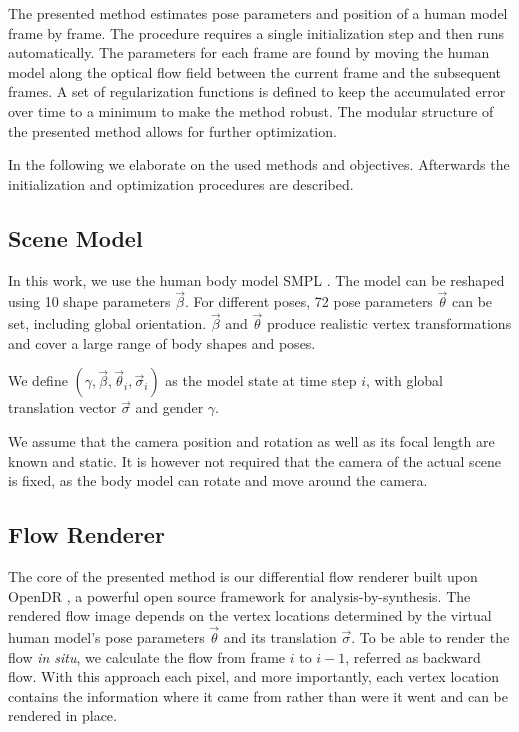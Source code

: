 \documentclass[10pt,twocolumn,letterpaper]{article}
\begin{document}
 The presented method estimates pose parameters and position of a human model frame by frame. The procedure requires a single initialization step and then runs automatically. The parameters for each frame are found by moving the human model along the optical flow field between the current frame and the subsequent frames. A set of regularization functions is defined to keep the accumulated error over time to a minimum to make the method robust. The modular structure of the presented method allows for further optimization.
 
 In the following we elaborate on the used methods and objectives. Afterwards the initialization and optimization procedures are described.
 
 \subsection{Scene Model}
 In this work, we use the human body model SMPL \cite{smpl2015loper}. %
 The model can be reshaped using 10 shape parameters $\vec{\beta}$. For different poses, 72 pose parameters $\vec{\theta}$ can be set, including global orientation. $\vec{\beta}$ and $\vec{\theta}$ produce realistic vertex transformations and cover a large range of body shapes and poses. 
 
 We define $(\gamma, \vec{\beta}, \vec{\theta}_i, \vec{\sigma}_i)$ as the model state at time step $i$, with global translation vector $\vec{\sigma}$ and gender $\gamma$. %
 
 We assume that the camera position and rotation as well as its focal length are known and static. It is however not required that the camera of the actual scene is fixed, as the body model can rotate and move around the camera.
 
 
 \subsection{Flow Renderer}
 
 The core of the presented method is our differential flow renderer built upon OpenDR \cite{loper2014opendr}, a powerful open source framework for analysis-by-synthesis. The rendered flow image depends on the vertex locations determined by the virtual human model's pose parameters $\vec{\theta}$ and its translation $\vec{\sigma}$. To be able to render the flow \emph{in situ}, we calculate the flow from frame $i$ to $i-1$, referred as backward flow. With this approach each pixel, and more importantly, each vertex location contains the information where it came from rather than were it went and can be rendered in place.
 
\end{document}
